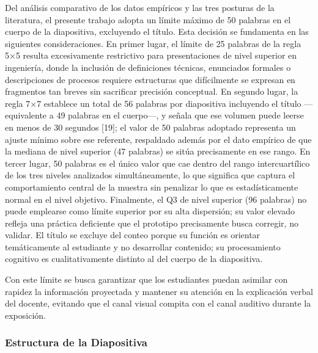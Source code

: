 \documentclass[11pt]{article}
\begin{document}
Del análisis comparativo de los datos empíricos y las tres posturas de la literatura, el presente trabajo adopta un límite máximo de 50 palabras en el cuerpo de la diapositiva, excluyendo el título. Esta decisión se fundamenta en las siguientes consideraciones. En primer lugar, el límite de 25 palabras de la regla 5×5 resulta excesivamente restrictivo para presentaciones de nivel superior en ingeniería, donde la inclusión de definiciones técnicas, enunciados formales o descripciones de procesos requiere estructuras que difícilmente se expresan en fragmentos tan breves sin sacrificar precisión conceptual. En segundo lugar, la regla 7×7 establece un total de 56 palabras por diapositiva incluyendo el título —equivalente a 49 palabras en el cuerpo—, y señala que ese volumen puede leerse en menos de 30 segundos [19]; el valor de 50 palabras adoptado representa un ajuste mínimo sobre ese referente, respaldado además por el dato empírico de que la mediana de nivel superior (47 palabras) se sitúa precisamente en ese rango. En tercer lugar, 50 palabras es el único valor que cae dentro del rango intercuartílico de los tres niveles analizados simultáneamente, lo que significa que captura el comportamiento central de la muestra sin penalizar lo que es estadísticamente normal en el nivel objetivo. Finalmente, el Q3 de nivel superior (96 palabras) no puede emplearse como límite superior por su alta dispersión; su valor elevado refleja una práctica deficiente que el prototipo precisamente busca corregir, no validar. El título se excluye del conteo porque su función es orientar temáticamente al estudiante y no desarrollar contenido; su procesamiento cognitivo es cualitativamente distinto al del cuerpo de la diapositiva.

Con este límite se busca garantizar que los estudiantes puedan asimilar con rapidez la información proyectada y mantener su atención en la explicación verbal del docente, evitando que el canal visual compita con el canal auditivo durante la exposición.

\subsubsection*{Estructura de la Diapositiva}
\end{document}
